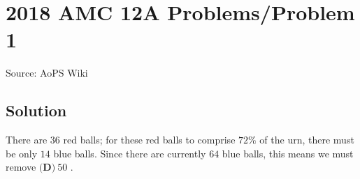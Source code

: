 \documentclass[12pt]{article}
\begin{document}
\section*{{2018 AMC 12A Problems/Problem 1}}
Source: AoPS Wiki

\subsection*{Solution}
There are $36$ red balls; for these red balls to comprise $72 \%$ of the urn, there must be only $14$ blue balls. Since there are currently $64$ blue balls, this means we must remove $\boxed{\textbf{(D)}\ 50}$ .
\end{document}
